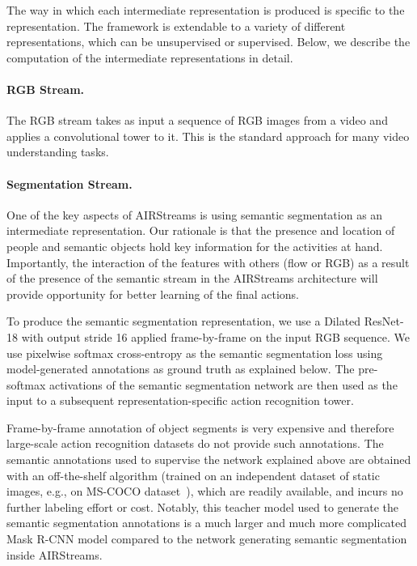 \documentclass[final]{cvpr}
\begin{document}
The way in which each intermediate representation is produced is specific to the representation. The framework is extendable to a variety of different representations, which can be unsupervised or supervised. Below, we describe the computation of the intermediate representations in detail.

\paragraph{RGB Stream.}
The RGB stream takes as input a sequence of RGB images from a video and applies a convolutional tower to it. This is the standard approach for many video understanding tasks. 


\paragraph{Segmentation Stream.}
One of the key aspects of AIRStreams is using semantic segmentation as an intermediate representation. Our rationale is that the presence and location of people and semantic objects hold key information for the activities at hand. 
Importantly, the interaction of the features with others (flow or RGB) as a result of the presence of the semantic stream in the AIRStreams architecture will provide opportunity for better learning of the final actions.

To produce the semantic segmentation representation, we use a Dilated ResNet-18 \cite{yu2017dilated} with output stride 16 applied frame-by-frame on the input RGB sequence. We use pixelwise softmax cross-entropy as the semantic segmentation loss using model-generated annotations as ground truth as explained below. The pre-softmax activations of the semantic segmentation network are then used as the input to a subsequent representation-specific action recognition tower. 

Frame-by-frame annotation of object segments is very expensive and therefore large-scale action recognition datasets do not provide such annotations. The semantic annotations used to supervise the network explained above are obtained with an off-the-shelf algorithm (trained on an independent dataset of static images, e.g., on MS-COCO dataset~\cite{mscoco}), which are readily available, and incurs no further labeling effort or cost. Notably, this teacher model used to generate the semantic segmentation annotations is a much larger and much more complicated Mask R-CNN model \cite{he2017rcnn} compared to the network generating semantic segmentation inside AIRStreams.
\end{document}
